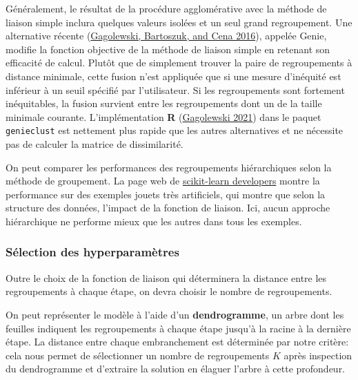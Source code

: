 \documentclass[
  11pt,
  letterpaper,
]{scrbook}
\theoremstyle{definition}
\theoremstyle{remark}
\begin{document}
Généralement, le résultat de la procédure agglomérative avec la méthode
de liaison simple inclura quelques valeurs isolées et un seul grand
regroupement. Une alternative récente
(\protect\hyperlink{ref-Gagolewski:2016}{Gagolewski, Bartoszuk, and Cena
2016}), appelée Genie, modifie la fonction objective de la méthode de
liaison simple en retenant son efficacité de calcul. Plutôt que de
simplement trouver la paire de regroupements à distance minimale, cette
fusion n'est appliquée que si une mesure d'inéquité est inférieur à un
seuil spécifié par l'utilisateur. Si les regroupements sont fortement
inéquitables, la fusion survient entre les regroupements dont un de la
taille minimale courante. L'implémentation \textbf{R}
(\protect\hyperlink{ref-Gagolewski:2021}{Gagolewski 2021}) dans le
paquet \texttt{genieclust} est nettement plus rapide que les autres
alternatives et ne nécessite pas de calculer la matrice de
dissimilarité.

On peut comparer les performances des regroupements hiérarchiques selon
la méthode de groupement. La page web de
\href{https://scikit-learn.org/stable/auto_examples/cluster/plot_linkage_comparison.html}{scikit-learn
developers} montre la performance sur des exemples jouets très
artificiels, qui montre que selon la structure des données, l'impact de
la fonction de liaison. Ici, aucun approche hiérarchique ne performe
mieux que les autres dans tous les exemples.

\hypertarget{suxe9lection-des-hyperparamuxe8tres}{%
\subsubsection{Sélection des
hyperparamètres}\label{suxe9lection-des-hyperparamuxe8tres}}

Outre le choix de la fonction de liaison qui déterminera la distance
entre les regroupements à chaque étape, on devra choisir le nombre de
regroupements.

On peut représenter le modèle à l'aide d'un \textbf{dendrogramme}, un
arbre dont les feuilles indiquent les regroupements à chaque étape
jusqu'à la racine à la dernière étape. La distance entre chaque
embranchement est déterminée par notre critère: cela nous permet de
sélectionner un nombre de regroupements \(K\) après inspection du
dendrogramme et d'extraire la solution en élaguer l'arbre à cette
profondeur.
\end{document}
